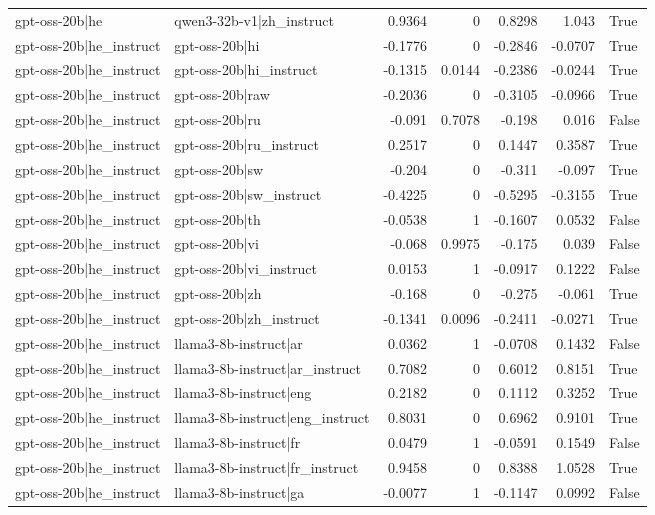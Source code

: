 \begin{table}
\begin{tabular}{l l r r r r l}
gpt-oss-20b|he & qwen3-32b-v1|zh_instruct & 0.9364 & 0 & 0.8298 & 1.043 & True \\
gpt-oss-20b|he_instruct & gpt-oss-20b|hi & -0.1776 & 0 & -0.2846 & -0.0707 & True \\
gpt-oss-20b|he_instruct & gpt-oss-20b|hi_instruct & -0.1315 & 0.0144 & -0.2386 & -0.0244 & True \\
gpt-oss-20b|he_instruct & gpt-oss-20b|raw & -0.2036 & 0 & -0.3105 & -0.0966 & True \\
gpt-oss-20b|he_instruct & gpt-oss-20b|ru & -0.091 & 0.7078 & -0.198 & 0.016 & False \\
gpt-oss-20b|he_instruct & gpt-oss-20b|ru_instruct & 0.2517 & 0 & 0.1447 & 0.3587 & True \\
gpt-oss-20b|he_instruct & gpt-oss-20b|sw & -0.204 & 0 & -0.311 & -0.097 & True \\
gpt-oss-20b|he_instruct & gpt-oss-20b|sw_instruct & -0.4225 & 0 & -0.5295 & -0.3155 & True \\
gpt-oss-20b|he_instruct & gpt-oss-20b|th & -0.0538 & 1 & -0.1607 & 0.0532 & False \\
gpt-oss-20b|he_instruct & gpt-oss-20b|vi & -0.068 & 0.9975 & -0.175 & 0.039 & False \\
gpt-oss-20b|he_instruct & gpt-oss-20b|vi_instruct & 0.0153 & 1 & -0.0917 & 0.1222 & False \\
gpt-oss-20b|he_instruct & gpt-oss-20b|zh & -0.168 & 0 & -0.275 & -0.061 & True \\
gpt-oss-20b|he_instruct & gpt-oss-20b|zh_instruct & -0.1341 & 0.0096 & -0.2411 & -0.0271 & True \\
gpt-oss-20b|he_instruct & llama3-8b-instruct|ar & 0.0362 & 1 & -0.0708 & 0.1432 & False \\
gpt-oss-20b|he_instruct & llama3-8b-instruct|ar_instruct & 0.7082 & 0 & 0.6012 & 0.8151 & True \\
gpt-oss-20b|he_instruct & llama3-8b-instruct|eng & 0.2182 & 0 & 0.1112 & 0.3252 & True \\
gpt-oss-20b|he_instruct & llama3-8b-instruct|eng_instruct & 0.8031 & 0 & 0.6962 & 0.9101 & True \\
gpt-oss-20b|he_instruct & llama3-8b-instruct|fr & 0.0479 & 1 & -0.0591 & 0.1549 & False \\
gpt-oss-20b|he_instruct & llama3-8b-instruct|fr_instruct & 0.9458 & 0 & 0.8388 & 1.0528 & True \\
gpt-oss-20b|he_instruct & llama3-8b-instruct|ga & -0.0077 & 1 & -0.1147 & 0.0992 & False \\

\end{tabular}
\end{table}
